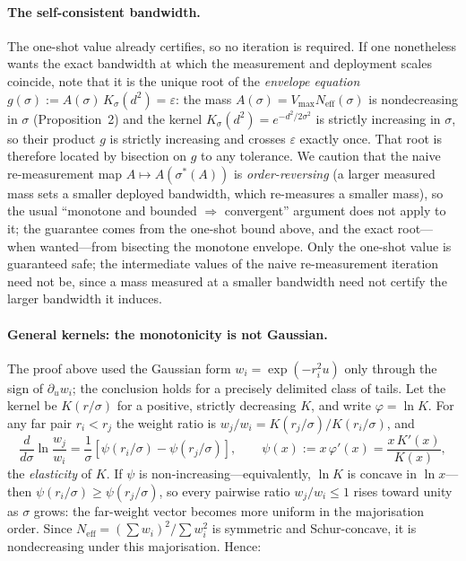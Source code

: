 \documentclass[10pt,twocolumn]{article}
\newcommand{\sstar}{\sigma^{*}}
\newcommand{\Neff}{N_{\mathrm{eff}}}
\begin{document}
\paragraph{The self-consistent bandwidth.} The one-shot value already certifies, so no iteration is required. If one nonetheless wants the exact bandwidth at which the measurement and deployment scales coincide, note that it is the unique root of the \emph{envelope equation} $g(\sigma):=A(\sigma)\,K_\sigma(d^2)=\varepsilon$: the mass $A(\sigma)=V_{\max}\Neff(\sigma)$ is nondecreasing in $\sigma$ (Proposition~2) and the kernel $K_\sigma(d^2)=e^{-d^2/2\sigma^2}$ is strictly increasing in $\sigma$, so their product $g$ is strictly increasing and crosses $\varepsilon$ exactly once. That root is therefore located by bisection on $g$ to any tolerance. We caution that the naive re-measurement map $A\!\mapsto\!A(\sstar(A))$ is \emph{order-reversing} (a larger measured mass sets a smaller deployed bandwidth, which re-measures a smaller mass), so the usual ``monotone and bounded $\Rightarrow$ convergent'' argument does not apply to it; the guarantee comes from the one-shot bound above, and the exact root---when wanted---from bisecting the monotone envelope. Only the one-shot value is guaranteed safe; the intermediate values of the naive re-measurement iteration need not be, since a mass measured at a smaller bandwidth need not certify the larger bandwidth it induces.

\paragraph{General kernels: the monotonicity is not Gaussian.} The proof above used the Gaussian form $w_i=\exp(-r_i^2 u)$ only through the sign of $\partial_u w_i$; the conclusion holds for a precisely delimited class of tails. Let the kernel be $K(r/\sigma)$ for a positive, strictly decreasing $K$, and write $\varphi=\ln K$. For any far pair $r_i<r_j$ the weight ratio is $w_j/w_i=K(r_j/\sigma)/K(r_i/\sigma)$, and
\begin{equation}
\frac{d}{d\sigma}\ln\frac{w_j}{w_i}=\frac{1}{\sigma}\left[\psi(r_i/\sigma)-\psi(r_j/\sigma)\right],\qquad \psi(x):=x\,\varphi'(x)=\frac{x\,K'(x)}{K(x)},
\end{equation}
the \emph{elasticity} of $K$. If $\psi$ is non-increasing---equivalently, $\ln K$ is concave in $\ln x$---then $\psi(r_i/\sigma)\ge\psi(r_j/\sigma)$, so every pairwise ratio $w_j/w_i\le1$ rises toward unity as $\sigma$ grows: the far-weight vector becomes more uniform in the majorisation order. Since $\Neff=(\sum w_i)^2/\sum w_i^2$ is symmetric and Schur-concave, it is nondecreasing under this majorisation. Hence:
\end{document}
